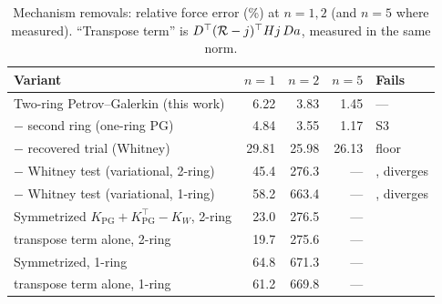 \begin{table}[t]\centering\small
\caption{Mechanism removals: relative force error (\%) at $n=1,2$ (and $n=5$ where measured). ``Transpose term'' is $D^\top(\mathcal{R}-j)^\top Hj\,Da$, measured in the same norm.}
\label{tab:removals}
\begin{tabular}{l rrr l}\toprule
Variant & $n=1$ & $n=2$ & $n=5$ & Fails \\ \midrule
Two-ring Petrov--Galerkin (this work) & 6.22 & 3.83 & 1.45 & --- \\
$-$ second ring (one-ring PG) & 4.84 & 3.55 & 1.17 & S3 \\
$-$ recovered trial (Whitney) & 29.81 & 25.98 & 26.13 & \BW{} floor \\
$-$ Whitney test (variational, 2-ring) & 45.4 & 276.3 & --- & \BW{}, diverges \\
$-$ Whitney test (variational, 1-ring) & 58.2 & 663.4 & --- & \BW{}, diverges \\
Symmetrized $K_{\mathrm{PG}}+K_{\mathrm{PG}}^\top-K_W$, 2-ring & 23.0 & 276.5 & --- & \BW{} \\
\quad transpose term alone, 2-ring & 19.7 & 275.6 & --- & \\
Symmetrized, 1-ring & 64.8 & 671.3 & --- & \BW{} \\
\quad transpose term alone, 1-ring & 61.2 & 669.8 & --- & \\
\bottomrule\end{tabular}\end{table}
